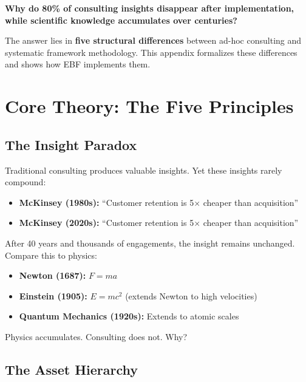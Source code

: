 \begin{tcolorbox}[colback=red!5!white, colframe=red!75!black,
    title=The Fundamental Question]
\textbf{Why do 80\% of consulting insights disappear after implementation, while scientific knowledge accumulates over centuries?}
\end{tcolorbox}

The answer lies in \textbf{five structural differences} between ad-hoc consulting and systematic framework methodology. This appendix formalizes these differences and shows how EBF implements them.


\section{Core Theory: The Five Principles}
\label{sec:fm-theory}

\subsection{The Insight Paradox}

Traditional consulting produces valuable insights. Yet these insights rarely compound:

\begin{itemize}
    \item \textbf{McKinsey (1980s):} ``Customer retention is 5$\times$ cheaper than acquisition''
    \item \textbf{McKinsey (2020s):} ``Customer retention is 5$\times$ cheaper than acquisition''
\end{itemize}

After 40 years and thousands of engagements, the insight remains unchanged. Compare this to physics:

\begin{itemize}
    \item \textbf{Newton (1687):} $F = ma$
    \item \textbf{Einstein (1905):} $E = mc^2$ (extends Newton to high velocities)
    \item \textbf{Quantum Mechanics (1920s):} Extends to atomic scales
\end{itemize}

Physics accumulates. Consulting does not. Why?

\subsection{The Asset Hierarchy}

